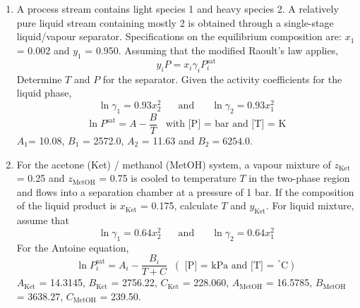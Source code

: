 \documentclass[calculator,fluidstables,datasheet,sample]{exam}
\newcommand{\frc}{\displaystyle\frac}
\begin{document}
\clearpage
\begin{question}
\begin{enumerate}

\item\label{Tut05P2} A process stream contains light species 1 and heavy species 2. A relatively pure liquid stream containing mostly 2 is obtained through a single-stage liquid/vapour separator. Specifications on the equilibrium composition are: $x_{1}$ = 0.002 and $y_{1}$ = 0.950. Assuming that the modified Raoult's law applies, 
\begin{displaymath}
  y_{i} P = x_{i}\gamma_{i}P_{i}^{\text{sat}}
\end{displaymath} 
Determine $T$ and $P$ for the separator. Given the activity coefficients for the liquid phase,
\begin{displaymath}
\ln\gamma_{1} = 0.93x_{2}^{2} \;\;\;\;\;\text{ and }\;\;\;\;\;\ln\gamma_{2}=0.93x_{1}^{2}
\end{displaymath}
\begin{displaymath}
\ln P^{\text{sat}} = A - \frc{B}{T}\;\;\;\text{with [P] = bar and [T] = K}
\end{displaymath} 
$A_{1}$= 10.08, $B_{1}$ = 2572.0, $A_{2}$ = 11.63 and $B_{2}=6254.0$.~

\item\label{SMVN} For the acetone (Ket) / methanol (MetOH) system, a vapour mixture of $z_{\text{Ket}}$ = 0.25 and $z_{\text{MetOH}}$ = 0.75 is cooled to temperature $T$ in the two-phase region and flows into a separation chamber at a pressure of 1 bar. If the composition of the liquid product is $x_{\text{Ket}}$ = 0.175, calculate $T$  and $y_{\text{Ket}}$. For liquid mixture, assume that
\begin{displaymath}
\ln\gamma_{1} = 0.64x_{2}^{2} \;\;\;\;\;\text{ and }\;\;\;\;\;\ln\gamma_{2}=0.64x_{1}^{2}
\end{displaymath}
For the Antoine equation, 
\begin{displaymath}
\ln P_{i}^{\text{sat}} = A_{i} - \frc{B_{i}}{T + C} \;\;\left(\text{ [P] = kPa and [T] = }^{\circ}\text{C}\right)
\end{displaymath}
$A_{\text{Ket}}$ = 14.3145, $B_{\text{Ket}}$ = 2756.22, $C_{\text{Ket}}$ = 228.060, $A_{\text{MetOH}}$ = 16.5785, $B_{\text{MetOH}}$ = 3638.27, $C_{\text{MetOH}}$ = 239.50.~

\end{enumerate}
\end{question}
\end{document}
